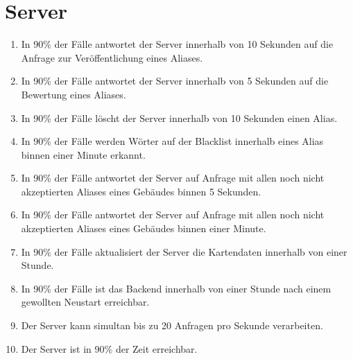 \section{Server}

\begin{enumerate}
    \item In 90\% der Fälle antwortet der Server innerhalb von 10 Sekunden auf die Anfrage zur Veröffentlichung eines Aliases.
    \item In 90\% der Fälle antwortet der Server innerhalb von 5 Sekunden auf die Bewertung eines Aliases.
    \item In 90\% der Fälle löscht der Server innerhalb von 10 Sekunden einen Alias.
    \item In 90\% der Fälle werden Wörter auf der Blacklist innerhalb eines Alias binnen einer Minute erkannt.
    \item In 90\% der Fälle antwortet der Server auf Anfrage mit allen noch nicht akzeptierten Aliases eines Gebäudes binnen 5 Sekunden.
    \item In 90\% der Fälle antwortet der Server auf Anfrage mit allen noch nicht akzeptierten Aliases eines Gebäudes binnen einer Minute.
    \item In 90\% der Fälle aktualisiert der Server die Kartendaten innerhalb von einer Stunde.
    \item In 90\% der Fälle ist das Backend innerhalb von einer Stunde nach einem gewollten Neustart erreichbar.
    \item Der Server kann simultan bis zu 20 Anfragen pro Sekunde verarbeiten.
    \item Der Server ist in 90\% der Zeit erreichbar. 
\end{enumerate}